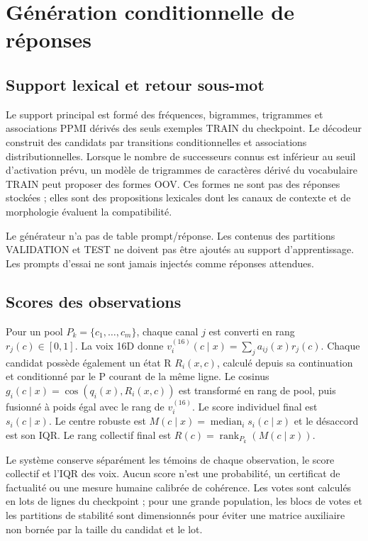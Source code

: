 \documentclass[11pt,a4paper]{report}
\newcommand{\Rank}{\operatorname{rank}}
\begin{document}
\chapter{Génération conditionnelle de réponses}
\section{Support lexical et retour sous-mot}
Le support principal est formé des fréquences, bigrammes, trigrammes et associations PPMI dérivés des seuls exemples TRAIN du checkpoint. Le décodeur construit des candidats par transitions conditionnelles et associations distributionnelles. Lorsque le nombre de successeurs connus est inférieur au seuil d'activation prévu, un modèle de trigrammes de caractères dérivé du vocabulaire TRAIN peut proposer des formes OOV. Ces formes ne sont pas des réponses stockées ; elles sont des propositions lexicales dont les canaux de contexte et de morphologie évaluent la compatibilité.

Le générateur n'a pas de table prompt/réponse. Les contenus des partitions VALIDATION et TEST ne doivent pas être ajoutés au support d'apprentissage. Les prompts d'essai ne sont jamais injectés comme réponses attendues.

\section{Scores des observations}
Pour un pool $P_k=\{c_1,\ldots,c_m\}$, chaque canal $j$ est converti en rang $r_j(c)\in[0,1]$. La voix 16D donne $v_i^{(16)}(c\mid x)=\sum_j a_{ij}(x)r_j(c)$. Chaque candidat possède également un état R $R_i(x,c)$, calculé depuis sa continuation et conditionné par le P courant de la même ligne. Le cosinus $g_i(c\mid x)=\cos(q_i(x),R_i(x,c))$ est transformé en rang de pool, puis fusionné à poids égal avec le rang de $v_i^{(16)}$. Le score individuel final est $s_i(c\mid x)$. Le centre robuste est $M(c\mid x)=\operatorname{median}_i s_i(c\mid x)$ et le désaccord est son IQR. Le rang collectif final est $R(c)=\Rank_{P_k}(M(c\mid x))$.

Le système conserve séparément les témoins de chaque observation, le score collectif et l'IQR des voix. Aucun score n'est une probabilité, un certificat de factualité ou une mesure humaine calibrée de cohérence. Les votes sont calculés en lots de lignes du checkpoint ; pour une grande population, les blocs de votes et les partitions de stabilité sont dimensionnés pour éviter une matrice auxiliaire non bornée par la taille du candidat et le lot.
\end{document}
